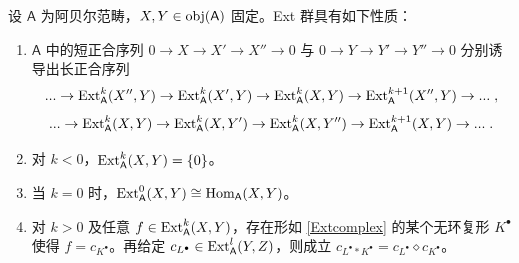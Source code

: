 
\begin{Thm}\label{Extprop}
	设 $\mathsf{A}$ 为阿贝尔范畴，$X,Y\in\textup{obj}(\mathsf{A})$ 固定。\textup{Ext} 群具有如下性质：
	\renewcommand{\theenumi}{\alph{enumi}}
	\begin{enumerate}[leftmargin=0.5cm]
		\item $\mathsf{A}$ 中的短正合序列 $0\rightarrow X\rightarrow X'\rightarrow X''\rightarrow 0$ 与 $0\rightarrow Y\rightarrow Y'\rightarrow Y''\rightarrow 0$ 分别诱导出长正合序列
		\[
		...\rightarrow \textup{Ext}_\mathsf{A}^k(X'',Y)\rightarrow \textup{Ext}_\mathsf{A}^k(X',Y)\rightarrow \textup{Ext}_\mathsf{A}^k(X,Y)\rightarrow \textup{Ext}_\mathsf{A}^{k+1}(X'',Y)\rightarrow...\;,
		\]
		\[
		...\rightarrow \textup{Ext}_\mathsf{A}^k(X,Y)\rightarrow \textup{Ext}_\mathsf{A}^k(X,Y')\rightarrow \textup{Ext}_\mathsf{A}^k(X,Y'')\rightarrow \textup{Ext}_\mathsf{A}^{k+1}(X,Y)\rightarrow...\;.
		\]
		
		\item 对 $k<0$，$\textup{Ext}_\mathsf{A}^k(X,Y)=\{0\}$。
		
		\item 当 $k=0$ 时，$\textup{Ext}_\mathsf{A}^0(X,Y)\cong \textup{Hom}_\mathsf{A}(X,Y)$。
		
		\item 对 $k>0$ 及任意 $f\in\textup{Ext}_\mathsf{A}^k(X,Y)$，存在形如 \eqref{Extcomplex} 的某个无环复形 $K^\bullet$ 使得 $f=c_{K^\bullet}$。再给定 $c_{L^\bullet}\in\textup{Ext}_\mathsf{A}^l(Y,Z)$，则成立 $c_{L^\bullet\ast K^\bullet}=c_{L^\bullet}\diamond c_{K^\bullet}$。
	\end{enumerate}
\end{Thm}

